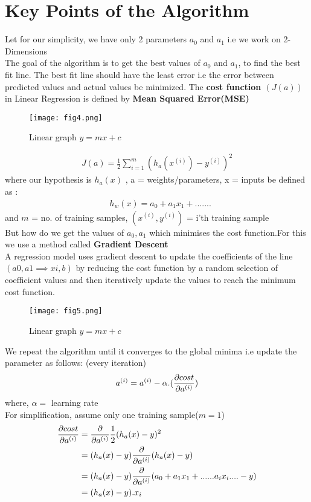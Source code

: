 \documentclass[a4paper, 11pt]{article}
\begin{document}
\section{Key Points of the Algorithm}
Let for our simplicity, we have only 2 parameters $a_0$ and $a_1$ i.e we work on 2-Dimensions\\
The goal of the algorithm is to get the best values of $a_0$ and $a_1$, to find the best fit line.
The best fit line should have the least error i.e the error between predicted values and actual values be minimized.
The \textbf{cost function $(J(a))$} in Linear Regression is defined by \textbf{Mean Squared Error(MSE)} 
\begin{figure}[h!]
    \texttt{[image: fig4.png]}
    \caption{Linear graph $y = mx +c $}
    \label{fig:fig4}
  \end{figure}
\begin{align}
    J(a) = \frac{1}{2} \sum_{i = 1}^m (h_a(x^{(i)})-y^{(i)})^2 
\end{align}
where our hypothesis is $h_a(x)$ , a = weights/parameters, x = inputs be defined as :
\begin{align}
    &h_w(x) = a_0 + a_1x_1 + ....... 
\end{align}
 and $m$  = no. of training samples, $(x^{(i)},y^{(i)})$ = i'th training sample\\
But how do we get the values of $a_0,a_1$ which minimises the cost function.For this we use a method called 
\textbf{Gradient Descent} \\
\hspace{5mm} A regression model uses gradient descent to update the coefficients of the line $(a0, a1 \implies xi, b)$ by 
reducing the cost function by a random selection of coefficient values and then iteratively update the values to reach the minimum cost function.
\begin{figure}[h!]
    \texttt{[image: fig5.png]}
    \caption{Linear graph $y = mx +c $}
    \label{fig:fig3}
  \end{figure}
We repeat the algorithm until it converges to the global minima i.e update the parameter as follows: (every iteration)
\begin{align}
    a^{(i)} &= a^{(i)} - \alpha .(\diffp{cost}{a^{(i)}})\\
\end{align}
where, $\alpha =$ learning rate\\
For simplification, assume only one training sample($m = 1$) 
\begin{align}
    \diffp{cost}{a^{(i)}} &= \diffp{}{a^{(i)}} \frac{1}{2}(h_a(x)-y)^2 \\
    &= (h_a(x)-y) \diffp{}{a^{(i)}} (h_a(x)-y)\\
    &= (h_a(x)-y) \diffp{}{a^{(i)}} (a_0 + a_1x_1 + ...... a_ix_i .... -y)\\
    &= (h_a(x)-y). x_i
\end{align}
\end{document}

